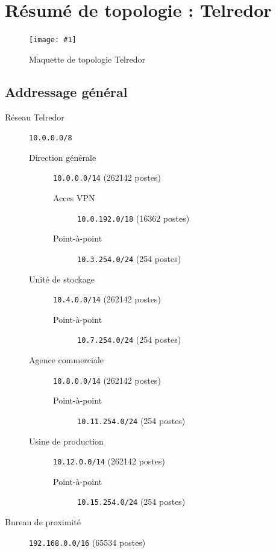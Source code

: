\documentclass{article}
\newenvironment{figue}[1]{
	\par
	\bigskip
	\begin{figure}[h]
	\begin{center}
	  \texttt{[image: \#1]}
	\end{center}
}{
	\end{figure}
	\bigskip
}
\newcommand{\tlr}{Telredor\xspace}
\begin{document}


\section{Résumé de topologie : \tlr}

\begin{figue}{img/telredor.pdf}
	\caption{Maquette de topologie \tlr}
\end{figue}

\subsection{Addressage général}

\begin{description}
	\item[Réseau \tlr] \texttt{10.0.0.0/8}
	\begin{description}
		\item[Direction générale] \texttt{10.0.0.0/14} (262142 postes)
		\begin{description}
			\item[Acces VPN] \texttt{10.0.192.0/18} (16362 postes)
			\item[Point-à-point] \texttt{10.3.254.0/24} (254 postes)
		\end{description}
		\item[Unité de stockage] \texttt{10.4.0.0/14} (262142 postes)
		\begin{description}
			\item[Point-à-point] \texttt{10.7.254.0/24} (254 postes)
		\end{description}
		\item[Agence commerciale] \texttt{10.8.0.0/14} (262142 postes)
		\begin{description}
			\item[Point-à-point] \texttt{10.11.254.0/24} (254 postes)
		\end{description}
		\item[Usine de production] \texttt{10.12.0.0/14} (262142 postes)
		\begin{description}
			\item[Point-à-point] \texttt{10.15.254.0/24} (254 postes)
		\end{description}
	\end{description}
	\item[Bureau de proximité] \texttt{192.168.0.0/16} (65534 postes)
\end{description}
\end{document}
